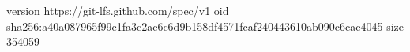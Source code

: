 version https://git-lfs.github.com/spec/v1
oid sha256:a40a087965f99c1fa3c2ac6c6d9b158df4571fcaf240443610ab090c6cac4045
size 354059

